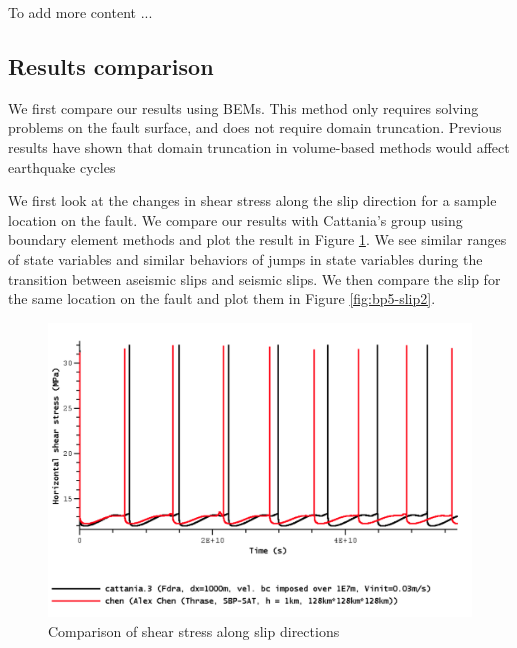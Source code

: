 To add more content ... 

\subsection{Results comparison}
We first compare our results using BEMs. This method only requires solving problems on the fault surface, and does not require domain truncation. Previous results have shown that domain truncation in volume-based methods would affect earthquake cycles

We first look at the changes in shear stress along the slip direction for a sample location on the fault. We compare our results with Cattania's group using boundary element methods and plot the result in Figure \ref{fig:bp5-shearstress}. We see similar ranges of state variables and similar behaviors of jumps in state variables during the transition between aseismic slips and seismic slips. We then compare the slip for the same location on the fault and plot them in Figure \ref{fig:bp5-slip2}.

\begin{figure}
    \centering
    \includegraphics[width=\linewidth]{figures/sample-shearstress.png}
    \caption{Comparison of shear stress along slip directions}
    \label{fig:bp5-shearstress}
\end{figure}

